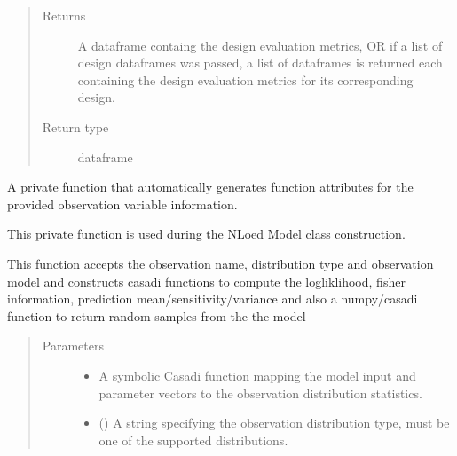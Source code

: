\documentclass[letterpaper,10pt,english,openany,oneside]{sphinxmanual}
\begin{document}
\begin{fulllineitems}
\begin{fulllineitems}
\begin{quote}
\begin{description}
\begin{itemize}
\end{itemize}

\item[{Returns}] \leavevmode
A dataframe containg the design evaluation metrics,
OR if a list of design dataframes was passed, a list of dataframes is returned
each containing the design evaluation metrics for its corresponding design.

\item[{Return type}] \leavevmode
dataframe

\end{description}\end{quote}

\end{fulllineitems}


\begin{fulllineitems}
\label{\detokenize{nloed:nloed.model.Model.__get_distribution_functions}}
A private function that automatically generates function attributes for the provided
observation variable information.

This private function is used during the NLoed Model class construction.

This function accepts the observation name, distribution type
and observation model and constructs casadi functions to compute
the logliklihood, fisher information, prediction mean/sensitivity/variance
and also a numpy/casadi function to return random samples from the the model
\begin{quote}\begin{description}
\item[{Parameters}] \leavevmode\begin{itemize}
\item {} 
 \textendash{} A symbolic Casadi function mapping the model input and parameter vectors
to the observation distribution statistics.

\item {} 
 () \textendash{} A string specifying the observation distribution type,
must be one of the supported distributions.


\end{itemize}
\end{description}
\end{quote}
\end{fulllineitems}
\end{fulllineitems}
\end{document}
